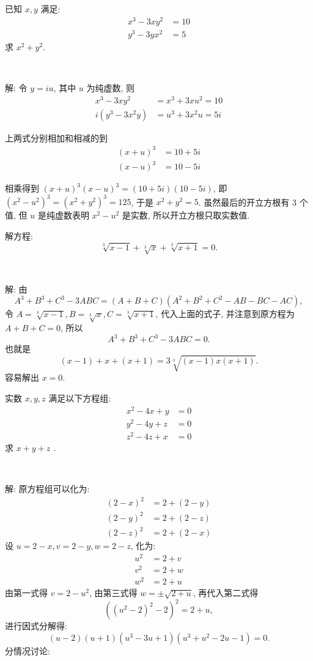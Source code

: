 已知 $x,y$ 满足:
\begin{align*}
x^3-3xy^2&=10\\
y^3-3yx^2&=5
\end{align*}
求 $x^2+y^2$.

~

解: 令 $y = iu$, 其中 $u$ 为纯虚数, 则 
\begin{align*} 
x^3-3xy^2 &= x^3+3xu^2=10\\
i(y^3-3x^2y) &= u^3+3x^2u=5i
\end{align*}

上两式分别相加和相减的到
\begin{align*}
(x+u)^3 & =10+5i\\
(x-u)^3 &= 10-5i
\end{align*}

相乘得到 $(x+u)^3(x-u)^3=(10+5i)(10-5i)$, 即 $(x^2-u^2)^3=(x^2+y^2)^3=125$, 于是 $x^2+y^2=5$. 虽然最后的开立方根有 3 个值, 但 $u$ 是纯虚数表明 $x^2-u^2$ 是实数, 所以开立方根只取实数值.


\newpage

解方程: 
\[\sqrt[3]{x-1} + \sqrt[3]{x} + \sqrt[3]{x+1} = 0 .\]

~

解: 由 
\[A^3+B^3+C^3 - 3ABC = (A+B+C)(A^2+B^2+C^2-AB-BC-AC), \]
令 $A = \sqrt[3]{x-1}, B = \sqrt[3]{x}, C = \sqrt[3]{x+1}$, 代入上面的式子, 并注意到原方程为 $A+B+C = 0$, 所以
\[A^3+B^3+C^3-3ABC = 0.\]
也就是
\[(x-1) + x + (x+1) = 3\sqrt[3]{(x-1)x(x+1)} .\]
容易解出 $x = 0$.

\newpage
实数 $x,y,z$ 满足以下方程组:
\begin{align*}
x^2 - 4x + y &= 0 \\
y^2 - 4y + z &= 0\\
z^2 - 4z + x &= 0
\end{align*}
求 $x+y+z$ .

~

解: 原方程组可以化为:
\begin{align*}
(2-x)^2 &= 2 + (2-y) \\
(2-y)^2 &= 2 + (2-z)\\
(2-z)^2 &= 2 + (2-x)
\end{align*}
设 $u = 2-x, v = 2-y, w = 2-z$, 化为:
\begin{align*}
u^2 &= 2 + v \\
v^2 &= 2 + w\\
w^2 &= 2 + u
\end{align*}
由第一式得 $v = 2 - u^2$, 由第三式得 $w = \pm\sqrt{2+u}$, 再代入第二式得
\[((u^2-2)^2 - 2)^2 = 2+u  ,\]
进行因式分解得:
\[(u-2)(u+1)(u^3-3u+1)(u^3+u^2-2u-1) = 0 .\]
分情况讨论:

